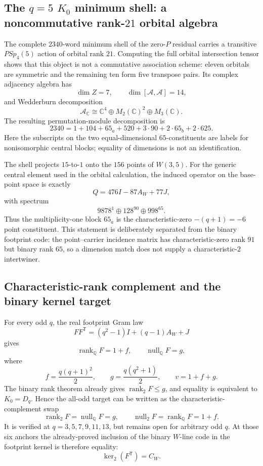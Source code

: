 \subsection{The $q=5$ $K_0$ minimum shell: a noncommutative rank-$21$ orbital algebra}

The complete $2340$-word minimum shell of the zero-$P$ residual carries a transitive
$PSp_4(5)$ action of orbital rank $21$.  Computing the full orbital intersection
tensor shows that this object is not a commutative association scheme: eleven
orbitals are symmetric and the remaining ten form five transpose pairs.  Its
complex adjacency algebra has
\[
 \dim Z=7,\qquad \dim[\mathcal A,\mathcal A]=14,
\]
and Wedderburn decomposition
\[
 \boxed{\mathcal A_{\mathbb C}\cong
 \mathbb C^4\oplus M_2(\mathbb C)^2\oplus M_3(\mathbb C).}
\]
The resulting permutation-module decomposition is
\[
 \boxed{
 2340=1+104+65_a+520+3\cdot90+2\cdot65_b+2\cdot625.
 }
\]
Here the subscripts on the two equal-dimensional $65$-constituents are labels for
nonisomorphic central blocks; equality of dimensions is not an identification.

The shell projects $15$-to-$1$ onto the $156$ points of $W(3,5)$.  For the generic
central element used in the orbital calculation, the induced operator on the
base-point space is exactly
\[
 Q=476I-87A_W+77J,
\]
with spectrum
\[
 9878^1\oplus128^{90}\oplus998^{65}.
\]
Thus the multiplicity-one block $65_a$ is the characteristic-zero
$-(q+1)=-6$ point constituent.  This statement is deliberately separated from
the binary footprint code: the point--carrier incidence matrix has
characteristic-zero rank $91$ but binary rank $65$, so a dimension match does not
supply a characteristic-$2$ intertwiner.

\subsection{Characteristic-rank complement and the binary kernel target}

For every odd $q$, the real footprint Gram law
\[
 FF^{\mathsf T}=(q^2-1)I+(q-1)A_W+J
\]
gives
\[
 \operatorname{rank}_{\mathbb Q}F=1+f,\qquad
 \operatorname{null}_{\mathbb Q}F=g,
\]
where
\[
 f=\frac{q(q+1)^2}{2},\qquad g=\frac{q(q^2+1)}{2},\qquad
 v=1+f+g.
\]
The binary rank theorem already gives $\operatorname{rank}_2F\le g$, and equality
is equivalent to $K_0=D_q$.  Hence the all-odd target can be written as the
characteristic-complement swap
\[
 \boxed{
 \operatorname{rank}_2F=\operatorname{null}_{\mathbb Q}F=g,
 \qquad
 \operatorname{null}_2F=\operatorname{rank}_{\mathbb Q}F=1+f.
 }
\]
It is verified at $q=3,5,7,9,11,13$, but remains open for arbitrary odd $q$.
At those six anchors the already-proved inclusion of the binary $W$-line code in
the footprint kernel is therefore equality:
\[
 \boxed{\ker_2(F^{\mathsf T})=C_W.}
\]

